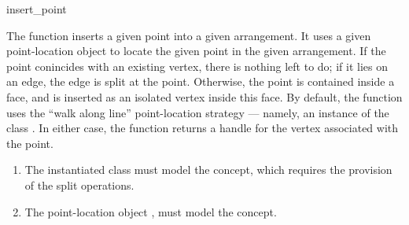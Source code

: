 \ccRefPageBegin

\begin{ccRefFunction}{insert_point}

\ccDefinition

The function \ccRefName{} inserts a given point into a given arrangement.
It uses a given point-location object to locate the given
point in the given arrangement. If the point conincides with an existing
vertex, there is nothing left to do; if it lies on an edge, the edge is
split at the point. Otherwise, the point is contained inside a face, and is
inserted as an isolated vertex inside this face.
By default, the function uses the ``walk along line'' point-location
strategy --- namely, an instance of the class
.
In either case, the function returns a handle for the vertex associated
with the point.



\ccRequirements
\begin{enumerate}
\item The instantiated  class must model the
   concept, which requires the provision
  of the split operations.
\item The point-location object , must model the
   concept.
\end{enumerate}

\end{ccRefFunction}

\ccRefPageEnd
